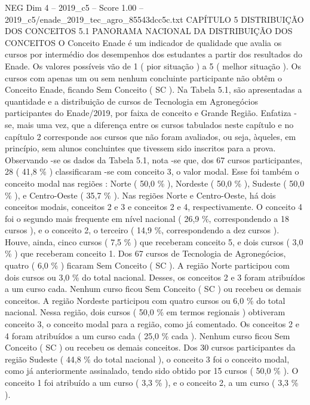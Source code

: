 \begin{textsample}{NEG Dim 4 – 2019\_c5 – Score 1.00 – 2019\_c5/enade\_2019\_tec\_agro\_85543dcc5c.txt}  \label{ex:f4_neg_165}
CAPÍTULO 5 DISTRIBUIÇÃO DOS CONCEITOS 5.1 PANORAMA NACIONAL DA DISTRIBUIÇÃO DOS CONCEITOS O Conceito Enade é um indicador de qualidade que avalia os cursos por intermédio dos desempenhos dos estudantes a partir dos resultados do Enade.
Os valores possíveis vão de 1 ( pior situação ) a 5 ( melhor situação ).
Os cursos com apenas um ou sem nenhum concluinte participante não obtêm o Conceito Enade, ficando Sem Conceito ( SC ).
Na Tabela 5.1, são apresentadas a quantidade e a distribuição de cursos de Tecnologia em Agronegócios participantes do Enade/2019, por faixa de conceito e Grande Região.
Enfatiza -se, mais uma vez, que a diferença entre os cursos tabulados neste capítulo e no capítulo 2 corresponde aos cursos que não foram avaliados, ou seja, àqueles, em princípio, sem alunos concluintes que tivessem sido inscritos para a prova.
Observando -se os dados da Tabela 5.1, nota -se que, dos 67 cursos participantes, 28 ( 41,8 \% ) classificaram -se com conceito 3, o valor modal.
Esse foi também o conceito modal nas regiões : Norte ( 50,0 \% ), Nordeste ( 50,0 \% ), Sudeste ( 50,0 \% ), e Centro-Oeste ( 35,7 \% ).
Nas regiões Norte e Centro-Oeste, há dois conceitos modais, conceitos 2 e 3 e conceitos 2 e 4, respectivamente.
O conceito 4 foi o segundo mais frequente em nível nacional ( 26,9 \%, correspondendo a 18 cursos ), e o conceito 2, o terceiro ( 14,9 \%, correspondendo a dez cursos ).
Houve, ainda, cinco cursos ( 7,5 \% ) que receberam conceito 5, e dois cursos ( 3,0 \% ) que receberam conceito 1.
Dos 67 cursos de Tecnologia de Agronegócios, quatro ( 6,0 \% ) ficaram Sem Conceito ( SC ).
A região Norte participou com dois cursos ou 3,0 \% do total nacional.
Desses, os conceitos 2 e 3 foram atribuídos a um curso cada.
Nenhum curso ficou Sem Conceito ( SC ) ou recebeu os demais conceitos.
A região Nordeste participou com quatro cursos ou 6,0 \% do total nacional.
Nessa região, dois cursos ( 50,0 \% em termos regionais ) obtiveram conceito 3, o conceito modal para a região, como já comentado.
Os conceitos 2 e 4 foram atribuídos a um curso cada ( 25,0 \% cada ).
Nenhum curso ficou Sem Conceito ( SC ) ou recebeu os demais conceitos.
Dos 30 cursos participantes da região Sudeste ( 44,8 \% do total nacional ), o conceito 3 foi o conceito modal, como já anteriormente assinalado, tendo sido obtido por 15 cursos ( 50,0 \% ).
O conceito 1 foi atribuído a um curso ( 3,3 \% ), e o conceito 2, a um curso ( 3,3 \% ).

\end{textsample}
